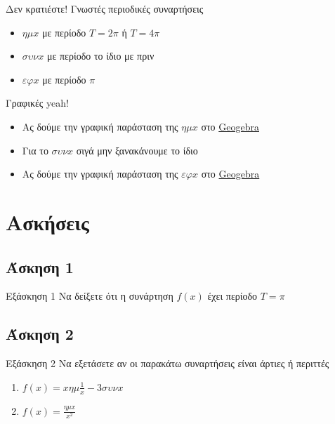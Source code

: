 \documentclass[greek]{beamer}
\begin{document}
\begin{frame}{Δεν κρατιέστε!}
 Γνωστές περιοδικές συναρτήσεις
 \begin{itemize}
  \item<1-> $ημx$ με περίοδο  $Τ=2π$  ή $Τ=4π$
  \item<4-> $συνx$ με περίοδο  το ίδιο με πριν
  \item<6-> $εφx$ με περίοδο  $π$
 \end{itemize}
\end{frame}

\begin{frame}{Γραφικές yeah!}
 \begin{itemize}
  \item<1-> Ας δούμε την γραφική παράσταση της $ημx$ στο \href{https://www.geogebra.org/m/jvvwgvru}{Geogebra}
  \item<2-> Για το $συνx$ σιγά μην ξανακάνουμε το ίδιο
  \item<3-> Ας δούμε την γραφική παράσταση της $εφx$ στο \href{https://www.geogebra.org/m/qmk7cmh2}{Geogebra}
 \end{itemize}
\end{frame}

\section{Ασκήσεις}
\subsection{Άσκηση 1}
\begin{frame}[label=Άσκηση1]{Εξάσκηση 1}
 Να δείξετε ότι η συνάρτηση $f(x)$ έχει περίοδο $Τ=π$

\end{frame}

\subsection{Άσκηση 2}
\begin{frame}[label=Άσκηση2]{Εξάσκηση 2}
 Να εξετάσετε αν οι παρακάτω συναρτήσεις είναι άρτιες ή περιττές
 \begin{enumerate}
  \item<1-> $f(x)=xημ\frac{1}{x}-3συνx$
  \item<2-> $f(x)=\frac{ημx}{x^2}$
 \end{enumerate}

\end{frame}
\end{document}
